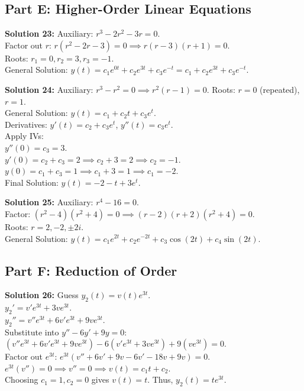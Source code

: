 \documentclass[11pt]{article}
\begin{document}
\subsection*{Part E: Higher-Order Linear Equations}

\textbf{Solution 23:} 
Auxiliary: $r^3 - 2r^2 - 3r = 0$. \\
Factor out $r$: $r(r^2 - 2r - 3) = 0 \implies r(r - 3)(r + 1) = 0$. \\
Roots: $r_1 = 0, r_2 = 3, r_3 = -1$. \\
General Solution: $y(t) = c_1e^{0t} + c_2e^{3t} + c_3e^{-t} = c_1 + c_2e^{3t} + c_3e^{-t}$.

\textbf{Solution 24:} 
Auxiliary: $r^3 - r^2 = 0 \implies r^2(r - 1) = 0$. Roots: $r = 0$ (repeated), $r = 1$. \\
General Solution: $y(t) = c_1 + c_2t + c_3e^t$. \\
Derivatives: $y'(t) = c_2 + c_3e^t$, \quad $y''(t) = c_3e^t$. \\
Apply IVs: \\
$y''(0) = c_3 = 3$. \\
$y'(0) = c_2 + c_3 = 2 \implies c_2 + 3 = 2 \implies c_2 = -1$. \\
$y(0) = c_1 + c_3 = 1 \implies c_1 + 3 = 1 \implies c_1 = -2$. \\
Final Solution: $y(t) = -2 - t + 3e^t$.

\textbf{Solution 25:} 
Auxiliary: $r^4 - 16 = 0$. \\
Factor: $(r^2 - 4)(r^2 + 4) = 0 \implies (r - 2)(r + 2)(r^2 + 4) = 0$. \\
Roots: $r = 2, -2, \pm 2i$. \\
General Solution: $y(t) = c_1e^{2t} + c_2e^{-2t} + c_3\cos(2t) + c_4\sin(2t)$.

\subsection*{Part F: Reduction of Order}

\textbf{Solution 26:} 
Guess $y_2(t) = v(t)e^{3t}$. \\
$y_2' = v'e^{3t} + 3ve^{3t}$. \\
$y_2'' = v''e^{3t} + 6v'e^{3t} + 9ve^{3t}$. \\
Substitute into $y'' - 6y' + 9y = 0$: \\
$(v''e^{3t} + 6v'e^{3t} + 9ve^{3t}) - 6(v'e^{3t} + 3ve^{3t}) + 9(ve^{3t}) = 0$. \\
Factor out $e^{3t}$: $e^{3t}(v'' + 6v' + 9v - 6v' - 18v + 9v) = 0$. \\
$e^{3t}(v'') = 0 \implies v'' = 0 \implies v(t) = c_1t + c_2$. \\
Choosing $c_1 = 1, c_2 = 0$ gives $v(t) = t$. Thus, $y_2(t) = te^{3t}$.
\end{document}
